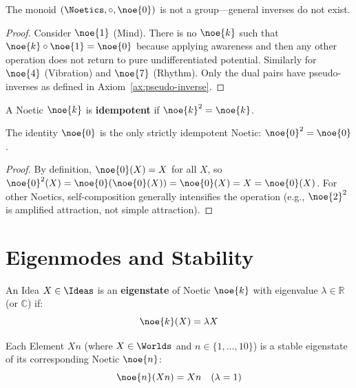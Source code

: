 \begin{proposition}
\label{prop:no-inverses}
The monoid $(\Noetics, \circ, \noe{0})$ is not a group---general inverses do not exist.
\end{proposition}

\begin{proof}
Consider $\noe{1}$ (Mind). There is no $\noe{k}$ such that $\noe{k} \circ \noe{1} = \noe{0}$ because applying awareness and then any other operation does not return to pure undifferentiated potential. Similarly for $\noe{4}$ (Vibration) and $\noe{7}$ (Rhythm). Only the dual pairs have pseudo-inverses as defined in Axiom~\ref{ax:pseudo-inverse}.
\end{proof}

\begin{definition}
\label{def:idempotent}
A Noetic $\noe{k}$ is \textbf{idempotent} if $\noe{k}^2 = \noe{k}$.
\end{definition}

\begin{proposition}
\label{prop:id-idempotent}
The identity $\noe{0}$ is the only strictly idempotent Noetic: $\noe{0}^2 = \noe{0}$.
\end{proposition}

\begin{proof}
By definition, $\noe{0}(X) = X$ for all $X$, so $\noe{0}^2(X) = \noe{0}(\noe{0}(X)) = \noe{0}(X) = X = \noe{0}(X)$. For other Noetics, self-composition generally intensifies the operation (e.g., $\noe{2}^2$ is amplified attraction, not simple attraction).
\end{proof}

\section{Eigenmodes and Stability}

\begin{definition}
\label{def:eigenstate}
An Idea $X \in \Ideas$ is an \textbf{eigenstate} of Noetic $\noe{k}$ with eigenvalue $\lambda \in \mathbb{R}$ (or $\mathbb{C}$) if:
\[
\noe{k}(X) = \lambda X
\]
\end{definition}

\begin{theorem}
\label{thm:element-noetic}
Each Element $Xn$ (where $X \in \Worlds$ and $n \in \{1,\ldots,10\}$) is a stable eigenstate of its corresponding Noetic $\noe{n}$:
\[
\noe{n}(Xn) = Xn \quad (\lambda = 1)
\]
\end{theorem}

